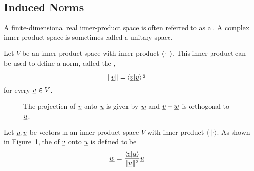 \subsection{Induced Norms}

A finite-dimensional real inner-product space is often referred to as a .
A complex inner-product space is sometimes called a unitary space.

\begin{definition}
Let $V$ be an inner-product space with inner product $\langle \cdot | \cdot \rangle$.
This inner product can be used to define a norm, called the ,
\begin{equation*}
\left\| \underline{v} \right\| = \left\langle \underline{v} | \underline{v} \right\rangle^{\frac{1}{2}}
\end{equation*}
for every $\underline{v} \in V$.
\end{definition}

\begin{figure}
\centering
{}
\caption{\label{fig:vector_projection}The projection of $\underline{v}$ onto $\underline{u}$ is given by $\underline{w}$ and $\underline{v}-\underline{w}$ is orthogonal to $\underline{u}$.}
\end{figure}

\begin{definition}
Let $\underline{u},\underline{v}$ be vectors in an inner-product space $V$ with inner product $\langle \cdot | \cdot \rangle$.
As shown in Figure~\ref{fig:vector_projection}, the  of $\underline{v}$ onto $\underline{u}$ is defined to be
\begin{equation*}
\underline{w} = \frac{\left\langle \underline{v} | \underline{u} \right\rangle}{\|\underline{u}\|^2} \underline{u}
\end{equation*}
\end{definition}

